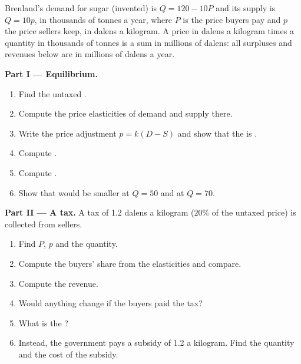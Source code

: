 \begin{problem}\label{pb:b1:partial-equilibrium-welfare:sugar}
Brenland's demand for sugar (invented) is $Q = 120 - 10P$ and its supply is
$Q = 10p$, in thousands of tonnes a year, where $P$ is the price buyers pay and
$p$ the price sellers keep, in dalens a kilogram. A price in dalens a
kilogram times a quantity in thousands of tonnes is a sum in millions of
dalens: all surpluses and revenues below are in millions of dalens a year.

\medskip\noindent\textbf{Part I --- Equilibrium.}
\begin{enumerate}
  \item Find the untaxed .
  \item Compute the price elasticities of demand and supply there.
  \item Write the price adjustment $\dot p = k(D - S)$ and show that the  is .
  \item Compute .
  \item Compute .
  \item Show that  would be smaller at $Q = 50$ and at $Q = 70$.
\end{enumerate}

\medskip\noindent\textbf{Part II --- A tax.} A tax of 1.2 dalens a kilogram ($20\%$
of the untaxed price) is collected from sellers.
\begin{enumerate}[resume]
  \item Find $P$, $p$ and the quantity.
  \item Compute the buyers' share from the elasticities and compare.
  \item Compute the revenue.
  \item Would anything change if the buyers paid the tax?
  \item What is the ?
  \item Instead, the government pays a subsidy of 1.2 a kilogram. Find the quantity and the cost of the subsidy.
\end{enumerate}


\end{problem}
